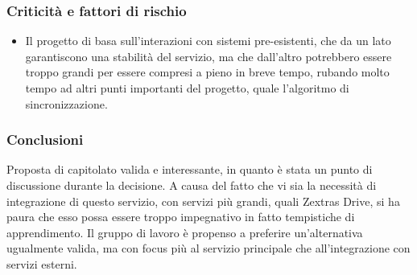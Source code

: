		\subsubsection{Criticità e fattori di rischio}
			\begin{itemize}
				\item Il progetto di basa sull’interazioni con sistemi pre-esistenti, che da un lato garantiscono una stabilità del servizio, ma che dall’altro potrebbero essere troppo grandi per essere compresi a pieno in breve tempo, rubando molto tempo ad altri punti importanti del progetto, quale l’algoritmo di sincronizzazione.
			\end{itemize}
		\subsubsection{Conclusioni}
			Proposta di capitolato valida e interessante, in quanto è stata un punto di discussione durante la decisione. A causa del fatto che vi sia la necessità di integrazione di questo servizio, con servizi più grandi, quali Zextras Drive, si ha paura che esso possa essere troppo impegnativo in fatto tempistiche di apprendimento. Il gruppo di lavoro è propenso a preferire un’alternativa ugualmente valida, ma con focus più al servizio principale che all’integrazione con servizi esterni.
\newpage
				
				
		
				
				
				
				
				
				
				
				
				
				
				
				
				
				
				
				
				